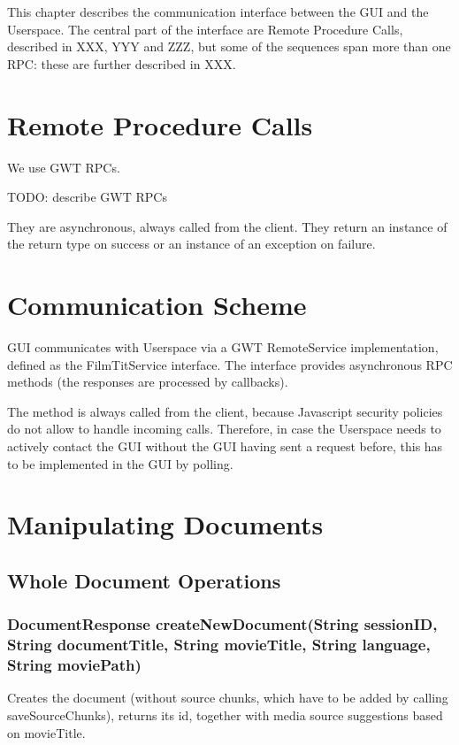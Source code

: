 \label{chap:communication}
\label{sec:communication}

This chapter describes the communication interface between the GUI and the Userspace. The central part of the interface are Remote Procedure Calls, described in XXX, YYY and ZZZ, but some of the sequences span more than one RPC: these are further described in XXX.

\section{Remote Procedure Calls}

We use GWT RPCs.

TODO: describe GWT RPCs

They are asynchronous, always called from the client. They return an instance of the return type on success or an instance of an exception on failure.

\section{Communication Scheme}
GUI communicates with Userspace via a GWT RemoteService implementation, defined as the FilmTitService interface.
The interface provides asynchronous RPC methods (the responses are processed by callbacks).

The method is always called from the client, because Javascript security policies do not allow to handle incoming calls.
Therefore, in case the Userspace needs to actively contact the GUI without the GUI having sent a request before,
this has to be implemented in the GUI by polling.

\section{Manipulating Documents}
\subsection{Whole Document Operations}

\subsubsection{DocumentResponse createNewDocument(String sessionID, String documentTitle, String movieTitle, String language, String moviePath)}

Creates the document
(without source chunks, which have to be added by calling saveSourceChunks),
returns its id, together with media source suggestions based on movieTitle.
     	

